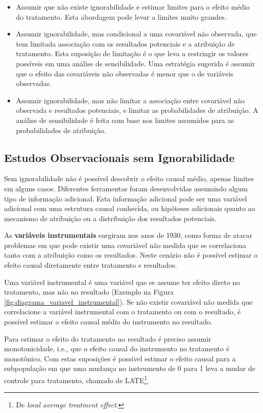\documentclass[final,5p]{elsarticle}
\numberwithin{equation}{section}
\begin{document}
    \begin{itemize}
        \item Assumir que não existe ignorabilidade e estimar limites para o efeito médio do tratamento. Esta abordagem pode levar a limites muito grandes.
        \item Assumir ignorabilidade, mas condicional a uma covariável não observada, que tem limitada associação com os resultados potenciais e a atribuição de tratamento. Esta suposição de limitação é o que leva a restringir os valores possíveis em uma análise de sensibilidade. Uma estratégia sugerida é assumir que o efeito das covariáveis não observadas é menor que o de variáveis observadas.
        \item Assumir ignorabilidade, mas não limitar a associação entre covariável não observada e resultados potenciais, e limitar as probabilidades de atribuição. A análise de sensibilidade é feita com base nos limites assumidos para as probabilidades de atribuição.
    \end{itemize}

    \subsection{Estudos Observacionais sem Ignorabilidade}

    Sem ignorabilidade não é possível descobrir o efeito causal médio, apenas limites em alguns casos. Diferentes ferramentas foram desenvolvidas assumindo algum tipo de informação adicional. Esta informação adicional pode ser uma variável adicional com uma estrutura causal conhecida, ou hipóteses adicionais quanto ao mecanismo de atribuição ou a distribuição dos resultados potenciais.

    As \textbf{variáveis instrumentais} surgiram nos anos de 1930, como forma de atacar problemas em que pode existir uma covariável não medida que se correlaciona tanto com a atribuição como os resultados. Neste cenário não é possível estimar o efeito causal diretamente entre tratamento e resultados.

    Uma variável instrumental é uma variável que se assume ter efeito direto no tratamento, mas não no resultado (Exemplo na Figura \ref{fig:diagrama_variavel_instrumental}). Se não existir covariável não medida que correlacione a variável instrumental com o tratamento ou com o resultado, é possível estimar o efeito causal médio do instrumento no resultado.

    Para estimar o efeito do tratamento no resultado é preciso assumir monotonicidade, i.e., que o efeito causal do instrumento no tratamento é monotônico. Com estas suposições é possível estimar o efeito causal para a subpopulação em que uma mudança no instrumento de 0 para 1 leva a mudar de controle para tratamento, chamado de LATE\footnote{De \textit{local average treatment effect}.}.
\end{document}
